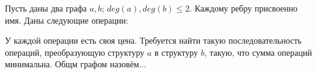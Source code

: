 \documentclass[a4paper,12pt]{article}
\begin{document}
Пусть даны два графа $a, b$; $deg(a), deg(b)\le 2$. Каждому ребру присвоенно имя. Даны следующие операции:\newline

У каждой операции есть своя цена. Требуется найти такую последовательность операций, преобразующую структуру $a$ в структуру $b$,
такую, что сумма операций минимальна.\newline
Общм графом назовём...\newline
\end{document}

